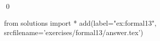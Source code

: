 
\begin{ex} 
  \label{ex:formal13}
  
  \qed
\end{ex} 
\begin{python0}
from solutions import *
add(label="ex:formal13",
    srcfilename='exercises/formal13/answer.tex') 
\end{python0}
